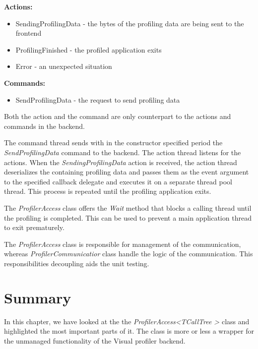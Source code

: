 \textbf{Actions:}
\begin{itemize}	
\item	SendingProfilingData - the bytes of the profiling data are being sent to the frontend
\item	ProfilingFinished - the profiled application exits
\item   Error - an unexpected situation
\end{itemize}

\textbf{Commands:}
\begin{itemize}	
\item	SendProfilingData - the request to send profiling data
\end{itemize}

Both the action and the command are only counterpart to the actions and commands in the backend.

The command thread sends with in the constructor specified period the \textit{SendProfilingData} command to the backend. The action thread listens for the actions. When the \textit{SendingProfilingData} action is received, the action thread deserializes the containing profiling data and passes them as the event argument to the specified callback delegate and executes it on a separate thread pool thread. This process is repeated until the profiling application exits.

The \textit{ProfilerAccess} class offers the \textit{Wait} method that blocks a calling thread until the profiling is completed. This can be used to prevent a main application thread to exit prematurely.

The \textit{ProfilerAccess} class is responsible for management of the communication, whereas \textit{ProfilerCommunicatior} class handle the logic of the communication. This responsibilities decoupling aids the unit testing.

\section{Summary}
In this chapter, we have looked at the the \textit{ProfilerAccess\textless TCallTree \textgreater} class and highlighted the most important parts of it. The class is more or less a wrapper for the unmanaged functionality of the Visual profiler backend.